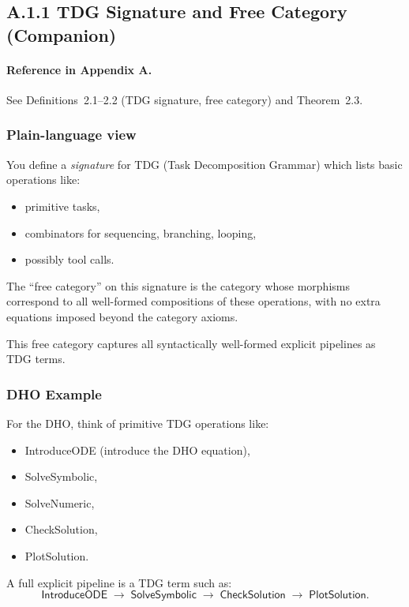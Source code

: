 \subsection{A.1.1 TDG Signature and Free Category (Companion)}

\paragraph{Reference in Appendix A.}
See Definitions~2.1--2.2 (TDG signature, free category) and Theorem~2.3.

\subsubsection*{Plain-language view}

You define a \emph{signature} for TDG (Task Decomposition Grammar) which lists basic operations like:

\begin{itemize}
 \item primitive tasks,
 \item combinators for sequencing, branching, looping,
 \item possibly tool calls.
\end{itemize}

The ``free category'' on this signature is the category whose morphisms correspond to all well-formed
compositions of these operations, with no extra equations imposed beyond the category axioms.

This free category captures all syntactically well-formed explicit pipelines as TDG terms.

\subsubsection*{DHO Example}

For the DHO, think of primitive TDG operations like:

\begin{itemize}
 \item \textsf{IntroduceODE} (introduce the DHO equation),
 \item \textsf{SolveSymbolic},
 \item \textsf{SolveNumeric},
 \item \textsf{CheckSolution},
 \item \textsf{PlotSolution}.
\end{itemize}

A full explicit pipeline is a TDG term such as:
\[
\textsf{IntroduceODE} \;\to\; \textsf{SolveSymbolic} \;\to\; \textsf{CheckSolution} \;\to\; \textsf{PlotSolution}.
\]

